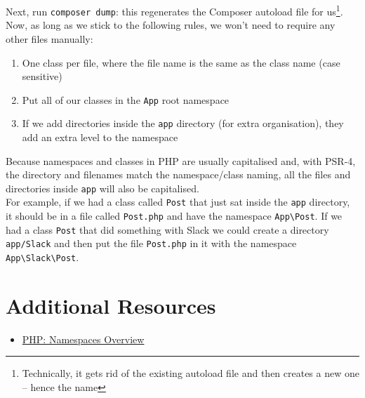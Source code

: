 Next, run \texttt{composer dump}: this regenerates the Composer autoload file for us\footnote{Technically, it gets rid of the existing autoload file and then creates a new one – hence the name}.
\\

Now, as long as we stick to the following rules, we won't need to require any other files manually:

\begin{enumerate}
    \item One class per file, where the file name is the same as the class name (case sensitive)
    \item Put all of our classes in the \texttt{App} root namespace
    \item If we add directories inside the \texttt{app} directory (for extra organisation), they add an extra level to the namespace
\end{enumerate}

Because namespaces and classes in PHP are usually capitalised and, with PSR-4, the directory and filenames match the namespace/class naming, all the files and directories inside \texttt{app} will also be capitalised.
\\

For example, if we had a class called \texttt{Post} that just sat inside the \texttt{app} directory, it should be in a file called \texttt{Post.php} and have the namespace \texttt{App\textbackslash Post}. If we had a class \texttt{Post} that did something with Slack we could create a directory \texttt{app/Slack} and then put the file \texttt{Post.php} in it with the namespace \texttt{App\textbackslash Slack\textbackslash Post}.


\section{Additional Resources}

\begin{itemize}[leftmargin=*]
    \item \href{http://www.php.net/manual/en/language.namespaces.rationale.php}{PHP: Namespaces Overview}
\end{itemize}
